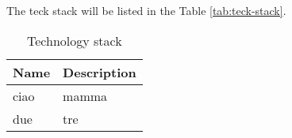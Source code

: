 The teck stack will be listed in the Table \ref{tab:teck-stack}.
\begin{longtable}{|p{}|p{}|}
	\caption{Technology stack}
	\label{Technology stack} \\
	\hline
	\textbf{Name} & \textbf{Description} \\
	\hline
	ciao & mamma \\
	\hline
	due & tre \\
	\hline
\end{longtable}%
	

